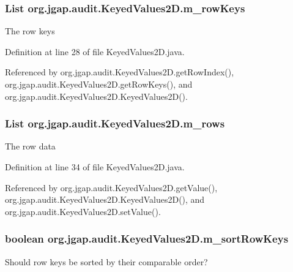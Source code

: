 \hypertarget{classorg_1_1jgap_1_1audit_1_1_keyed_values2_d_ad145c9abe9f3decc0c45ce8535ab108d}{
\subsubsection[{m\-\_\-row\-Keys}]{\setlength{\rightskip}{0pt plus 5cm}List org.\-jgap.\-audit.\-Keyed\-Values2\-D.\-m\-\_\-row\-Keys\hspace{0.3cm}{\ttfamily [private]}}}\label{classorg_1_1jgap_1_1audit_1_1_keyed_values2_d_ad145c9abe9f3decc0c45ce8535ab108d}
The row keys 

Definition at line 28 of file Keyed\-Values2\-D.\-java.



Referenced by org.\-jgap.\-audit.\-Keyed\-Values2\-D.\-get\-Row\-Index(), org.\-jgap.\-audit.\-Keyed\-Values2\-D.\-get\-Row\-Keys(), and org.\-jgap.\-audit.\-Keyed\-Values2\-D.\-Keyed\-Values2\-D().

\hypertarget{classorg_1_1jgap_1_1audit_1_1_keyed_values2_d_a71728c8c375dd98c99ac17a434dd2a8e}{
\subsubsection[{m\-\_\-rows}]{\setlength{\rightskip}{0pt plus 5cm}List org.\-jgap.\-audit.\-Keyed\-Values2\-D.\-m\-\_\-rows\hspace{0.3cm}{\ttfamily [private]}}}\label{classorg_1_1jgap_1_1audit_1_1_keyed_values2_d_a71728c8c375dd98c99ac17a434dd2a8e}
The row data 

Definition at line 34 of file Keyed\-Values2\-D.\-java.



Referenced by org.\-jgap.\-audit.\-Keyed\-Values2\-D.\-get\-Value(), org.\-jgap.\-audit.\-Keyed\-Values2\-D.\-Keyed\-Values2\-D(), and org.\-jgap.\-audit.\-Keyed\-Values2\-D.\-set\-Value().

\hypertarget{classorg_1_1jgap_1_1audit_1_1_keyed_values2_d_a757976950b14fb997db021c7efdc083d}{
\subsubsection[{m\-\_\-sort\-Row\-Keys}]{\setlength{\rightskip}{0pt plus 5cm}boolean org.\-jgap.\-audit.\-Keyed\-Values2\-D.\-m\-\_\-sort\-Row\-Keys\hspace{0.3cm}{\ttfamily [private]}}}\label{classorg_1_1jgap_1_1audit_1_1_keyed_values2_d_a757976950b14fb997db021c7efdc083d}
Should row keys be sorted by their comparable order? 

